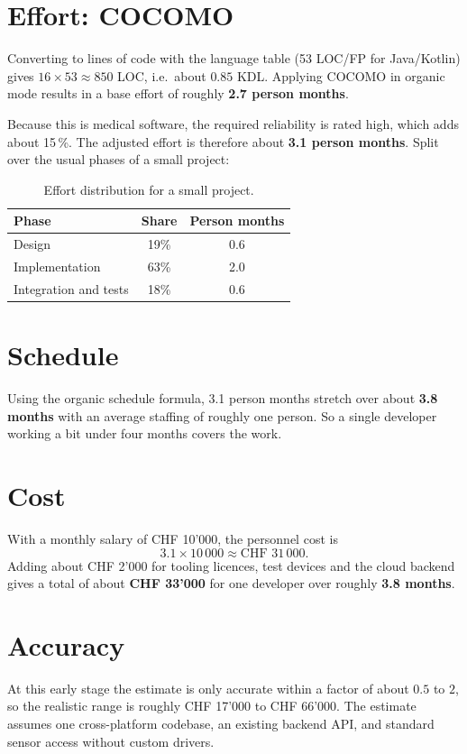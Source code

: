 \documentclass[11pt]{article}
\begin{document}
\section{Effort: COCOMO}
Converting to lines of code with the language table (53 LOC/FP for Java/Kotlin)
gives $16 \times 53 \approx 850$ LOC, i.e.\ about $0.85$ KDL. Applying COCOMO in
organic mode results in a base effort of roughly \textbf{2.7 person months}.

Because this is medical software, the required reliability is rated high, which
adds about 15\,\%. The adjusted effort is therefore about \textbf{3.1 person
months}. Split over the usual phases of a small project:

\begin{table}[h]
\centering
\begin{tabular}{l c c}
\toprule
\textbf{Phase} & \textbf{Share} & \textbf{Person months} \\
\midrule
Design                & 19\% & 0.6 \\
Implementation        & 63\% & 2.0 \\
Integration and tests & 18\% & 0.6 \\
\bottomrule
\end{tabular}
\caption{Effort distribution for a small project.}
\end{table}

\section{Schedule}
Using the organic schedule formula, 3.1 person months stretch over about
\textbf{3.8 months} with an average staffing of roughly one person. So a single
developer working a bit under four months covers the work.

\section{Cost}
With a monthly salary of CHF 10'000, the personnel cost is
\[
3.1 \times 10\,000 \approx \text{CHF } 31\,000.
\]
Adding about CHF 2'000 for tooling licences, test devices and the cloud backend
gives a total of about \textbf{CHF 33'000} for one developer over roughly
\textbf{3.8 months}.

\section{Accuracy}
At this early stage the estimate is only accurate within a factor of about
$0.5$ to $2$, so the realistic range is roughly CHF 17'000 to CHF 66'000. The
estimate assumes one cross-platform codebase, an existing backend API, and
standard sensor access without custom drivers.
\end{document}
